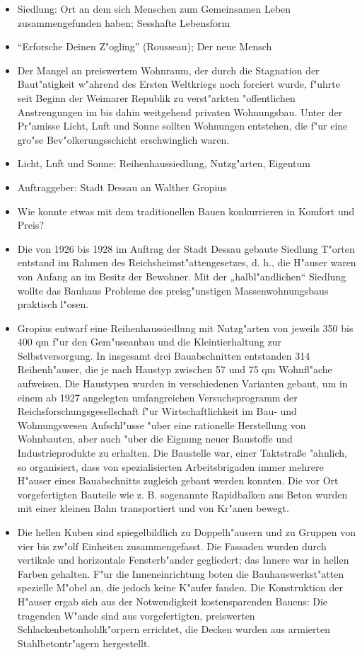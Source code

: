 \documentclass[emulatestandardclasses]{scrartcl}
\begin{document}
\begin{itemize}
  \item Siedlung: Ort an dem sich Menschen zum Gemeinsamen Leben zusammengefunden haben; Sesshafte Lebensform
  \item "`Erforsche Deinen Z"ogling"' (Rousseau); Der neue Mensch
  \item Der Mangel an preiswertem Wohnraum, der durch die Stagnation der Baut"atigkeit w"ahrend des Ersten Weltkriegs noch forciert wurde, f"uhrte seit Beginn der Weimarer Republik zu verst"arkten "offentlichen Anstrengungen im bis dahin weitgehend privaten Wohnungsbau. Unter der Pr"amisse Licht, Luft und Sonne sollten Wohnungen entstehen, die f"ur eine gro"se Bev"olkerungsschicht erschwinglich waren.
  \item Licht, Luft und Sonne; Reihenhaussiedlung, Nutzg"arten, Eigentum
  \item Auftraggeber: Stadt Dessau an Walther Gropius
  \item Wie konnte etwas mit dem traditionellen Bauen konkurrieren in Komfort und Preis?
  \item Die von 1926 bis 1928 im Auftrag der Stadt Dessau gebaute Siedlung T"orten entstand im Rahmen des Reichsheimst"attengesetzes, d. h., die H"auser waren von Anfang an im Besitz der Bewohner. Mit der „halbl"andlichen“ Siedlung wollte das Bauhaus Probleme des preisg"unstigen Massenwohnungsbaus praktisch l"osen.
  \item Gropius entwarf eine Reihenhaussiedlung mit Nutzg"arten von jeweils 350 bis 400 qm f"ur den Gem"useanbau und die Kleintierhaltung zur Selbstversorgung. In insgesamt drei Bauabschnitten entstanden 314 Reihenh"auser, die je nach Haustyp zwischen 57 und 75 qm Wohnfl"ache aufweisen. Die Haustypen wurden in verschiedenen Varianten gebaut, um in einem ab 1927 angelegten umfangreichen Versuchsprogramm der Reichsforschungsgesellschaft f"ur Wirtschaftlichkeit im Bau- und Wohnungswesen Aufschl"usse "uber eine rationelle Herstellung von Wohnbauten, aber auch "uber die Eignung neuer Baustoffe und Industrieprodukte zu erhalten. Die Baustelle war, einer Taktstraße "ahnlich, so organisiert, dass von spezialisierten Arbeitsbrigaden immer mehrere H"auser eines Bauabschnitts zugleich gebaut werden konnten. Die vor Ort vorgefertigten Bauteile wie z. B. sogenannte Rapidbalken aus Beton wurden mit einer kleinen Bahn transportiert und von Kr"anen bewegt.
  \item Die hellen Kuben sind spiegelbildlich zu Doppelh"ausern und zu Gruppen von vier bis zw"olf Einheiten zusammengefasst. Die Fassaden wurden durch vertikale und horizontale Fensterb"ander gegliedert; das Innere war in hellen Farben gehalten. F"ur die Inneneinrichtung boten die Bauhauswerkst"atten spezielle M"obel an, die jedoch keine K"aufer fanden. Die Konstruktion der H"auser ergab sich aus der Notwendigkeit kostensparenden Bauens: Die tragenden W"ande sind aus vorgefertigten, preiswerten Schlackenbetonhohlk"orpern errichtet, die Decken wurden aus armierten Stahlbetontr"agern hergestellt.

\end{itemize}
\end{document}
